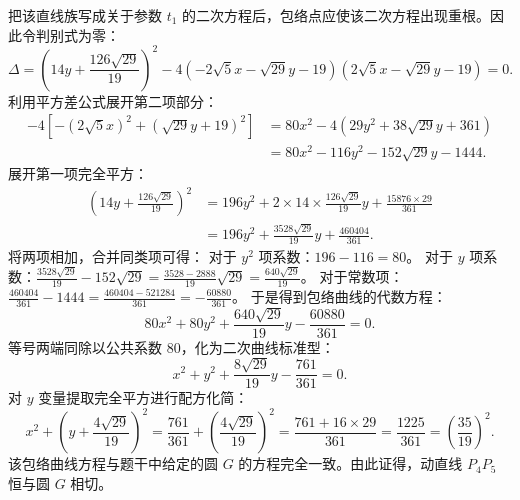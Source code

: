 \begin{solution}
\[\]
把该直线族写成关于参数 $t_1$ 的二次方程后，包络点应使该二次方程出现重根。因此令判别式为零：
\[
\Delta = \left( 14 y + \frac{126\sqrt{29}}{19} \right)^2 - 4 \left( -2\sqrt{5} x - \sqrt{29} y - 19 \right) \left( 2\sqrt{5} x - \sqrt{29} y - 19 \right) = 0.
\]
利用平方差公式展开第二项部分：
\begin{align*}
-4 \left[ -\left(2\sqrt{5} x\right)^2 + \left(\sqrt{29} y + 19\right)^2 \right] &= 80 x^2 - 4\left( 29 y^2 + 38\sqrt{29}y + 361 \right) \\
&= 80 x^2 - 116 y^2 - 152\sqrt{29}y - 1444.
\end{align*}
展开第一项完全平方：
\begin{align*}
\left( 14 y + \frac{126\sqrt{29}}{19} \right)^2 &= 196 y^2 + 2 \times 14 \times \frac{126\sqrt{29}}{19} y + \frac{15876 \times 29}{361} \\
&= 196 y^2 + \frac{3528\sqrt{29}}{19} y + \frac{460404}{361}.
\end{align*}
将两项相加，合并同类项可得：
对于 $y^2$ 项系数：$196 - 116 = 80$。
对于 $y$ 项系数：$\frac{3528\sqrt{29}}{19} - 152\sqrt{29} = \frac{3528 - 2888}{19} \sqrt{29} = \frac{640\sqrt{29}}{19}$。
对于常数项：$\frac{460404}{361} - 1444 = \frac{460404 - 521284}{361} = -\frac{60880}{361}$。
于是得到包络曲线的代数方程：
\[
80 x^2 + 80 y^2 + \frac{640\sqrt{29}}{19} y - \frac{60880}{361} = 0.
\]
等号两端同除以公共系数 $80$，化为二次曲线标准型：
\[
x^2 + y^2 + \frac{8\sqrt{29}}{19} y - \frac{761}{361} = 0.
\]
对 $y$ 变量提取完全平方进行配方化简：
\[
x^2 + \left( y + \frac{4\sqrt{29}}{19} \right)^2 = \frac{761}{361} + \left( \frac{4\sqrt{29}}{19} \right)^2 = \frac{761 + 16 \times 29}{361} = \frac{1225}{361} = \left( \frac{35}{19} \right)^2.
\]
该包络曲线方程与题干中给定的圆 $G$ 的方程完全一致。由此证得，动直线 $P_4P_5$ 恒与圆 $G$ 相切。
\end{solution}


